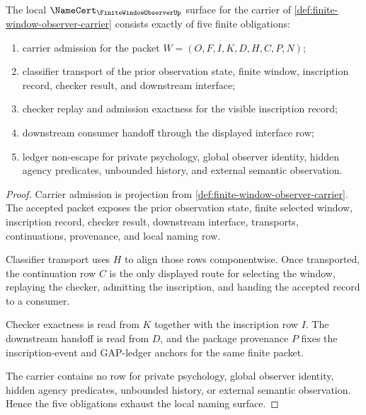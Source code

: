 \begin{theorem}
\label{thm:finite-window-observer-namecert-obligations}
The local $\NameCert_{\FiniteWindowObserverUp}$ surface for the carrier of \autoref{def:finite-window-observer-carrier} consists exactly of five finite obligations:
\begin{enumerate}
\item carrier admission for the packet $W=(O,F,I,K,D,H,C,P,N)$;
\item classifier transport of the prior observation state, finite window, inscription record, checker result, and downstream interface;
\item checker replay and admission exactness for the visible inscription record;
\item downstream consumer handoff through the displayed interface row;
\item ledger non-escape for private psychology, global observer identity, hidden agency predicates, unbounded history, and external semantic observation.
\end{enumerate}
\end{theorem}
\begin{proof}
Carrier admission is projection from \autoref{def:finite-window-observer-carrier}. The accepted packet exposes the prior observation state, finite selected window, inscription record, checker result, downstream interface, transports, continuations, provenance, and local naming row.

Classifier transport uses $H$ to align those rows componentwise. Once transported, the continuation row $C$ is the only displayed route for selecting the window, replaying the checker, admitting the inscription, and handing the accepted record to a consumer.

Checker exactness is read from $K$ together with the inscription row $I$. The downstream handoff is read from $D$, and the package provenance $P$ fixes the inscription-event and GAP-ledger anchors for the same finite packet.

The carrier contains no row for private psychology, global observer identity, hidden agency predicates, unbounded history, or external semantic observation. Hence the five obligations exhaust the local naming surface.
\end{proof}

